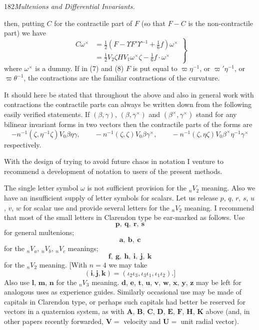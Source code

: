 \documentclass[11pt]{article}
\begin{document}
\newpage\thispagestyle{empty}\begin{center}182\hfill \textit{Multenions and Differential Invariants.}\end{center}
then, putting $C$ for the contractile part of $F$ (so that $F-C$ is the non-contractile part) we have
\[
  \left.\begin{aligned}
    C\omega^\times&=\tfrac12(F-\Upsilon F'\Upsilon^{-1}+\tfrac16f)\omega^\times\\
      &=\tfrac12V_2\zeta HV_1\omega^\times\zeta-\tfrac16f\mathbin{\cdot}\omega^\times
  \end{aligned}\right\}
  \tag{8}
\]
where $\omega^\times$ is a dummy. If in (7) and (8) $F$ is put equal to $\varpi\eta^{-1}$, or $\varpi'\eta^{-1}$, or $\varpi\theta^{-1}$, the contractions are the familiar contractions of the curvature.

\indent It should here be stated that throughout the above and also in general work with contractions the contractile parts can always be written down from the following easily verified statements. If $(\beta,\gamma)$, $(\beta,\gamma^\times)$ and $(\beta^\times,\gamma^\times)$ stand for any bilinear invariant forms in two vectors then the contractile parts of the forms are
\[
  -n^{-1}(\zeta,\eta^{-1}\zeta)V_0\beta\eta\gamma,\qquad
  -n^{-1}(\zeta,\zeta)V_0\beta\gamma^\times,\qquad
  -n^{-1}(\zeta,\eta\zeta)V_0\beta^\times\eta^{-1}\gamma^\times
\]
respectively.

\indent With the design of trying to avoid future chaos in notation I venture to recommend a development of notation to users of the present methods.

\indent The single letter symbol $\omega$ is not sufficient provision for the ${}_nV_2$ meaning. Also we have an insufficient supply of letter symbols for scalars. Let us release $p$, $q$, $r$, $s$, $u$, $v$, $w$ for scalar use and provide several letters for the ${}_nV_2$ meaning. I recommend that most of the small letters in Clarendon type be ear-marked as follows. Use
\[
  \mathbf{p},\ \mathbf{q},\ \mathbf{r},\ \mathbf{s}
\]
for general multenions;
\[
  \mathbf{a},\ \mathbf{b},\ \mathbf{c}
\]
for the ${}_nV_a$, ${}_nV_b$, ${}_nV_c$ meanings;
\[
  \mathbf{f},\ \mathbf{g},\ \mathbf{h},\ \mathbf{i},\ \mathbf{j},\ \mathbf{k}
\]
for the ${}_nV_2$ meaning. [With $n=4$ we may take
\[
  (\mathbf{i},\mathbf{j},\mathbf{k})=(\iota_2\iota_3,\iota_3\iota_1,\iota_1\iota_2).]
\]
Also use $\mathbf{l}$, $\mathbf{m}$, $\mathbf{n}$ for the ${}_nV_3$ meaning. $\mathbf{d}$, $\mathbf{e}$, $\mathbf{t}$, $\mathbf{u}$, $\mathbf{v}$, $\mathbf{w}$, $\mathbf{x}$, $\mathbf{y}$, $\mathbf{z}$ may be left for analogous uses as experience guides. Similarly occasional use may be made of capitals in Clarendon type, or perhaps such capitals had better be reserved for vectors in a quaternion system, as with $\mathbf{A}$, $\mathbf{B}$, $\mathbf{C}$, $\mathbf{D}$, $\mathbf{E}$, $\mathbf{F}$, $\mathbf{H}$, $\mathbf{K}$ above (and, in other papers recently forwarded, $\mathbf{V}=$ velocity and $\mathbf{U}=$ unit radial vector).
\end{document}
